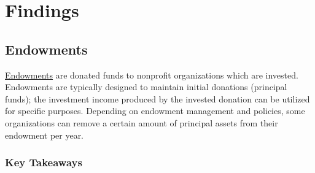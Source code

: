 \documentclass[Dance Data
Project,article,submit,moreauthors,pdftex]{mdpi}
\begin{document}
\newpage

\hypertarget{findings}{%
\section{Findings}\label{findings}}

\hypertarget{endowments}{%
\subsection{Endowments}\label{endowments}}

\href{https://www.investopedia.com/terms/e/endowment.asp}{Endowments}
are donated funds to nonprofit organizations which are invested.
Endowments are typically designed to maintain initial donations
(principal funds); the investment income produced by the invested
donation can be utilized for specific purposes. Depending on endowment
management and policies, some organizations can remove a certain amount
of principal assets from their endowment per year.

\hypertarget{key-takeaways}{%
\subsubsection{Key Takeaways}\label{key-takeaways}}
\end{document}
